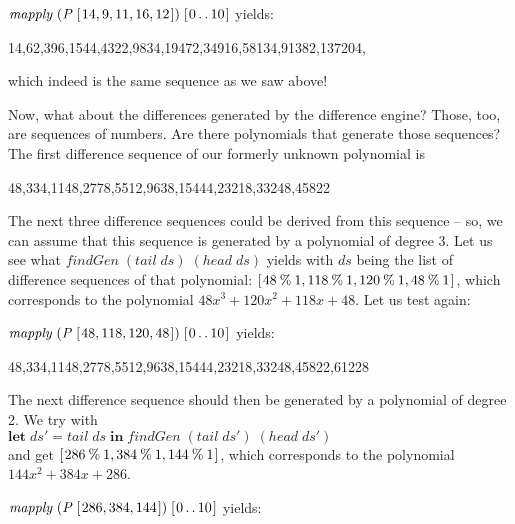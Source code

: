 \documentclass[tikz]{scrreprt}
\newcommand{\Conid}[1]{\mathit{#1}}
\newcommand{\Varid}[1]{\mathit{#1}}
\begin{document}
\ensuremath{\Varid{mapply}\;(\Conid{P}\;[\mskip1.5mu \mathrm{14},\mathrm{9},\mathrm{11},\mathrm{16},\mathrm{12}\mskip1.5mu])\;[\mskip1.5mu \mathrm{0}\mathinner{\ldotp\ldotp}\mathrm{10}\mskip1.5mu]} yields:

14,62,396,1544,4322,9834,19472,34916,58134,91382,137204,

which indeed is the same sequence as we saw above!

Now, what about the differences generated
by the difference engine? Those, too, are sequences
of numbers. Are there polynomials
that generate those sequences?
The first difference sequence of our formerly unknown polynomial is

48,334,1148,2778,5512,9638,15444,23218,33248,45822

The next three difference sequences could be derived
from this sequence -- so, we can assume that this sequence
is generated by a polynomial of degree 3. Let us see
what \ensuremath{\Varid{findGen}\;(\Varid{tail}\;\Varid{ds})\;(\Varid{head}\;\Varid{ds})} yields with \ensuremath{\Varid{ds}}
being the list of difference sequences of that polynomial:
\ensuremath{[\mskip1.5mu \mathrm{48}\mathbin{\%}\mathrm{1},\mathrm{118}\mathbin{\%}\mathrm{1},\mathrm{120}\mathbin{\%}\mathrm{1},\mathrm{48}\mathbin{\%}\mathrm{1}\mskip1.5mu]}, 
which corresponds to the polynomial 
$48x^3 + 120x^2 + 118x + 48$.
Let us test again:

\ensuremath{\Varid{mapply}\;(\Conid{P}\;[\mskip1.5mu \mathrm{48},\mathrm{118},\mathrm{120},\mathrm{48}\mskip1.5mu])\;[\mskip1.5mu \mathrm{0}\mathinner{\ldotp\ldotp}\mathrm{10}\mskip1.5mu]} yields:

48,334,1148,2778,5512,9638,15444,23218,33248,45822,61228

The next difference sequence should then be generated
by a polynomial of degree 2. We try with\\
\ensuremath{\mathbf{let}\;\Varid{ds'}\mathrel{=}\Varid{tail}\;\Varid{ds}\;\mathbf{in}\;\Varid{findGen}\;(\Varid{tail}\;\Varid{ds'})\;(\Varid{head}\;\Varid{ds'})}\\
 and get
\ensuremath{[\mskip1.5mu \mathrm{286}\mathbin{\%}\mathrm{1},\mathrm{384}\mathbin{\%}\mathrm{1},\mathrm{144}\mathbin{\%}\mathrm{1}\mskip1.5mu]},
which corresponds to the polynomial 
$144x^2 + 384x + 286$.

\ensuremath{\Varid{mapply}\;(\Conid{P}\;[\mskip1.5mu \mathrm{286},\mathrm{384},\mathrm{144}\mskip1.5mu])\;[\mskip1.5mu \mathrm{0}\mathinner{\ldotp\ldotp}\mathrm{10}\mskip1.5mu]} yields:
\end{document}
